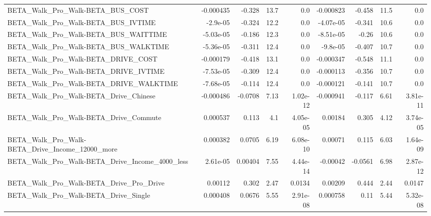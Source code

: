 \begin{tabular}{lrrrrrrrr}
BETA\_Walk\_Pro\_Walk-BETA\_BUS\_COST                   &   -0.000435 &       -0.328 &      13.7 &      0.0 &  -0.000823 &      -0.458 &         11.5 &           0.0 \\
BETA\_Walk\_Pro\_Walk-BETA\_BUS\_IVTIME                 &    -2.9e-05 &       -0.324 &      12.2 &      0.0 &  -4.07e-05 &      -0.341 &         10.6 &           0.0 \\
BETA\_Walk\_Pro\_Walk-BETA\_BUS\_WAITTIME               &   -5.03e-05 &       -0.186 &      12.3 &      0.0 &  -8.51e-05 &       -0.26 &         10.6 &           0.0 \\
BETA\_Walk\_Pro\_Walk-BETA\_BUS\_WALKTIME               &   -5.36e-05 &       -0.311 &      12.4 &      0.0 &   -9.8e-05 &      -0.407 &         10.7 &           0.0 \\
BETA\_Walk\_Pro\_Walk-BETA\_DRIVE\_COST                 &   -0.000179 &       -0.418 &      13.1 &      0.0 &  -0.000347 &      -0.548 &         11.1 &           0.0 \\
BETA\_Walk\_Pro\_Walk-BETA\_DRIVE\_IVTIME               &   -7.53e-05 &       -0.309 &      12.4 &      0.0 &  -0.000113 &      -0.356 &         10.7 &           0.0 \\
BETA\_Walk\_Pro\_Walk-BETA\_DRIVE\_WALKTIME             &   -7.68e-05 &       -0.114 &      12.4 &      0.0 &  -0.000121 &      -0.141 &         10.7 &           0.0 \\
BETA\_Walk\_Pro\_Walk-BETA\_Drive\_Chinese              &   -0.000486 &      -0.0708 &      7.13 & 1.02e-12 &  -0.000941 &      -0.117 &         6.61 &      3.81e-11 \\
BETA\_Walk\_Pro\_Walk-BETA\_Drive\_Commute              &    0.000537 &        0.113 &       4.1 & 4.05e-05 &    0.00184 &       0.305 &         4.12 &      3.74e-05 \\
BETA\_Walk\_Pro\_Walk-BETA\_Drive\_Income\_12000\_more    &    0.000382 &       0.0705 &      6.19 & 6.08e-10 &    0.00071 &       0.115 &         6.03 &      1.64e-09 \\
BETA\_Walk\_Pro\_Walk-BETA\_Drive\_Income\_4000\_less     &    2.61e-05 &      0.00404 &      7.55 & 4.44e-14 &   -0.00042 &     -0.0561 &         6.98 &      2.87e-12 \\
BETA\_Walk\_Pro\_Walk-BETA\_Drive\_Pro\_Drive            &     0.00112 &        0.302 &      2.47 &   0.0134 &    0.00209 &       0.444 &         2.44 &        0.0147 \\
BETA\_Walk\_Pro\_Walk-BETA\_Drive\_Single               &    0.000408 &       0.0676 &      5.55 & 2.91e-08 &   0.000758 &        0.11 &         5.44 &      5.32e-08 \\

\end{tabular}
